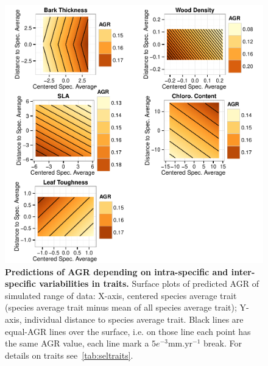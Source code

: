 \begin{figure}[!ptb]
	\centering
	\includegraphics{figures/Sel_Traits_Simul_AGR_2015-05-28.pdf}
	\caption{\textbf{Predictions of AGR depending on intra-specific and inter-specific variabilities in traits.} Surface plots of predicted AGR of simulated range of data: X-axis, centered species average trait (species average trait minus mean of all species average trait); Y-axis, individual distance to species average trait. Black lines are equal-AGR lines over the surface, i.e. on those line each point has the same AGR value, each line mark a $5e^{-3}\text{mm}.\text{yr}^{-1}$ break. For details on traits see~\autoref{tab:seltraits}.}
	\label{fig:simul}
\end{figure}
